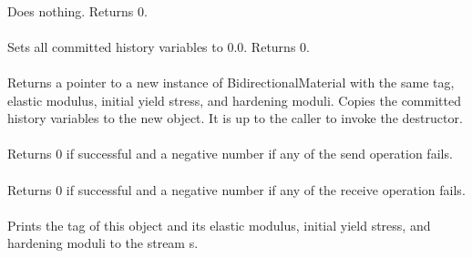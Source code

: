  \\
Does nothing. Returns 0. \\

 \\
Sets all committed history variables to $0.0$. Returns 0. \\

 \\
Returns a pointer to a new instance of BidirectionalMaterial with the 
same tag, elastic modulus, initial yield stress, and 
hardening moduli. Copies the committed history variables to the 
new object. It is up to the caller to invoke the destructor. \\

\\
Returns 0 if successful and a negative number if any of the 
send operation fails. \\

\\
Returns 0 if successful and a negative number if any of the 
receive operation fails. \\

 \\
Prints the tag of this object and its elastic modulus, initial yield
stress, and hardening moduli to the stream \p s.

